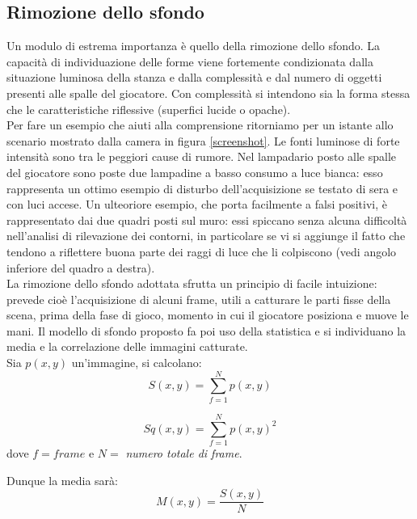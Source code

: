 \documentclass[a4paper,10pt, twocolumn]{article}
\begin{document}
  \subsection{Rimozione dello sfondo}
  Un modulo di estrema importanza \`{e} quello della rimozione dello sfondo.
  La capacit\`{a} di individuazione delle forme viene fortemente condizionata
  dalla situazione luminosa della stanza e dalla complessit\`{a} 
  e dal numero di oggetti presenti alle spalle del giocatore.
  Con complessit\`{a} si intendono sia la forma stessa che le caratteristiche 
  riflessive (superfici lucide o opache).\\
  Per fare un esempio che aiuti alla comprensione ritorniamo per un istante
  allo scenario mostrato dalla camera in figura \ref{screenshot}.
  Le fonti luminose di forte intensit\`{a} sono tra le peggiori 
  cause di rumore. Nel lampadario posto alle spalle del giocatore sono poste
  due lampadine a basso consumo a luce bianca: esso rappresenta un ottimo esempio
  di disturbo dell'acquisizione se testato di sera e con luci accese.
  Un ulteoriore esempio, che porta facilmente a falsi positivi,
  \`{e} rappresentato dai due quadri posti sul muro: essi spiccano senza alcuna
  difficolt\`{a} nell'analisi di rilevazione dei contorni, in particolare 
  se vi si aggiunge il fatto che tendono a riflettere buona parte dei
  raggi di luce che li colpiscono (vedi angolo inferiore del quadro 
  a destra).\\
  La rimozione dello sfondo adottata sfrutta un principio di facile intuizione: 
  prevede cio\`{e} l'acquisizione di alcuni frame,
  utili a catturare le parti fisse della scena,
  prima della fase di gioco, momento in cui il giocatore
  posiziona e muove le mani. Il modello di sfondo proposto fa poi uso 
  della statistica e si individuano la media e la correlazione 
  delle immagini catturate.\\
  Sia $p(x,y)$ un'immagine, si calcolano: 
  \begin{equation}
  S(x,y) = \sum_{f=1}^{N} p(x,y) 
  \end{equation} 
  
  \begin{equation}
  Sq(x,y) = \sum_{f=1}^{N} p(x,y)^2 
  \end{equation}   
  dove $f=frame$ e $N=$ \textit{numero totale di frame}.
  
  Dunque la media sar\`{a}:  
  \begin{equation}
   M(x,y) = \dfrac{S(x,y)}{N}
  \end{equation}
  
\end{document}
